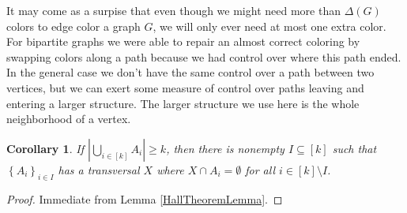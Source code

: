 \documentclass[openany]{tufte-book} %
\theoremstyle{plain}
\newtheorem{corollary}{Corollary}
\newcommand{\set}[1]{\left\{ #1 \right\}}
\newcommand{\card}[1]{\left|#1\right|}
\newcommand{\irange}[1]{\left[#1\right]}
\begin{document}
It may come as a surpise that even though we might need more than $\Delta(G)$ colors to edge color a graph $G$, we will only ever need at most one extra color.
For bipartite graphs we were able to repair an almost correct coloring by swapping colors along a path because we had control over where this path ended.  In the
general case we don't have the same control over a path between two vertices, but we can exert some measure of control over paths leaving and entering a larger structure. 
The larger structure we use here is the whole neighborhood of a vertex.

\begin{corollary}\label{TransversalCorollary}
If $\card{\bigcup_{i \in \irange{k}} A_i} \ge k$, then there is nonempty $I \subseteq \irange{k}$ such that $\set{A_i}_{i \in I}$ has a transversal $X$ where $X \cap A_i = \emptyset$
for all $i \in \irange{k} \setminus I$.
\end{corollary}
\begin{proof}
Immediate from Lemma \ref{HallTheoremLemma}.
\end{proof}
\end{document}
